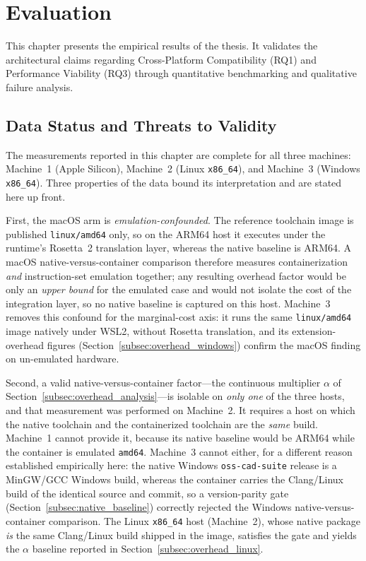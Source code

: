 
\chapter{Evaluation}
\label{ch:evaluation}

This chapter presents the empirical results of the thesis. It validates the architectural claims regarding Cross-Platform Compatibility (RQ1) and Performance Viability (RQ3) through quantitative benchmarking and qualitative failure analysis.

\section{Data Status and Threats to Validity}
\label{sec:data_status}
The measurements reported in this chapter are complete for all three machines: Machine~1 (Apple Silicon), Machine~2 (Linux \texttt{x86\_64}), and Machine~3 (Windows \texttt{x86\_64}). Three properties of the data bound its interpretation and are stated here up front.

First, the macOS arm is \emph{emulation-confounded}. The reference toolchain image is published \texttt{linux/amd64} only, so on the ARM64 host it executes under the runtime's Rosetta~2 translation layer, whereas the native baseline is ARM64. A macOS native-versus-container comparison therefore measures containerization \emph{and} instruction-set emulation together; any resulting overhead factor would be only an \emph{upper bound} for the emulated case and would not isolate the cost of the integration layer, so no native baseline is captured on this host. Machine~3 removes this confound for the marginal-cost axis: it runs the same \texttt{linux/amd64} image natively under WSL2, without Rosetta translation, and its extension-overhead figures (Section~\ref{subsec:overhead_windows}) confirm the macOS finding on un-emulated hardware.

Second, a valid native-versus-container factor---the continuous multiplier $\alpha$ of Section~\ref{subsec:overhead_analysis}---is isolable on \emph{only one} of the three hosts, and that measurement was performed on Machine~2. It requires a host on which the native toolchain and the containerized toolchain are the \emph{same} build. Machine~1 cannot provide it, because its native baseline would be ARM64 while the container is emulated \texttt{amd64}. Machine~3 cannot either, for a different reason established empirically here: the native Windows \texttt{oss-cad-suite} release is a MinGW/GCC Windows build, whereas the container carries the Clang/Linux build of the identical source and commit, so a version-parity gate (Section~\ref{subsec:native_baseline}) correctly rejected the Windows native-versus-container comparison. The Linux \texttt{x86\_64} host (Machine~2), whose native package \emph{is} the same Clang/Linux build shipped in the image, satisfies the gate and yields the $\alpha$ baseline reported in Section~\ref{subsec:overhead_linux}.

